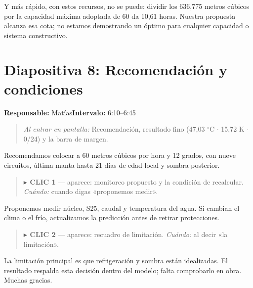 \documentclass[11pt,a4paper]{article}
\newenvironment{indicacion}{\begin{quote}\small\color{grisindicacion}}{\end{quote}}
\newcommand{\lamina}[4]{%
  \section*{\color{petroleo}Diapositiva #1: #2}%
  \textbf{Responsable:} #3\hfill\textbf{Intervalo:} #4\par
}
\begin{document}
Y más rápido, con estos recursos, no se puede: dividir los 636,775 metros cúbicos por la capacidad máxima adoptada de 60 da 10,61 horas. Nuestra propuesta alcanza esa cota; no estamos demostrando un óptimo para cualquier capacidad o sistema constructivo.



\clearpage

\lamina{8}{Recomendación y condiciones}{Matías}{6:10--6:45}

\begin{indicacion}\emph{Al entrar en pantalla:} Recomendación, resultado fino (47,03 \ensuremath{^\circ}C \ensuremath{\cdot} 15,72 K \ensuremath{\cdot} 0/24) y la barra de margen.\end{indicacion}


Recomendamos colocar a 60 metros cúbicos por hora y 12 grados, con nueve circuitos, última manta hasta 21 días de edad local y sombra posterior.



\begin{indicacion}\textbf{\ensuremath{\blacktriangleright} CLIC 1} --- aparece: monitoreo propuesto y la condición de recalcular. \emph{Cuándo:} cuando digas «proponemos medir».\end{indicacion}


Proponemos medir núcleo, S25, caudal y temperatura del agua. Si cambian el clima o el frío, actualizamos la predicción antes de retirar protecciones.



\begin{indicacion}\textbf{\ensuremath{\blacktriangleright} CLIC 2} --- aparece: recuadro de limitación. \emph{Cuándo:} al decir «la limitación».\end{indicacion}


La limitación principal es que refrigeración y sombra están idealizadas. El resultado respalda esta decisión dentro del modelo; falta comprobarlo en obra. Muchas gracias.
\end{document}
